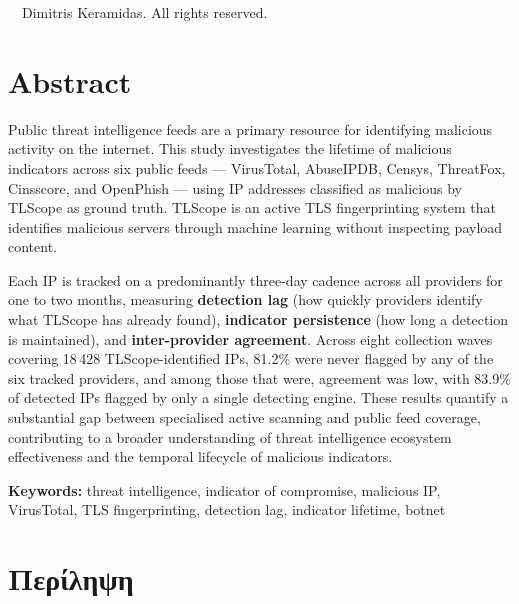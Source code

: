 \documentclass[12pt, a4paper, twoside]{report}
\begin{document}
\cleardoublepage

\thispagestyle{empty}
\vspace*{\fill}
\begin{center}
  \textcopyright\ \the\year\ Dimitris Keramidas. All rights reserved.
\end{center}
\vspace*{\fill}
\cleardoublepage

\chapter*{Abstract}

Public threat intelligence feeds are a primary resource for identifying malicious activity on the
internet. This study investigates the lifetime of malicious indicators across six public feeds
--- VirusTotal, AbuseIPDB, Censys, ThreatFox, Cinsscore, and OpenPhish --- using IP addresses
classified as malicious by TLScope as ground truth. TLScope is an active TLS fingerprinting system
that identifies malicious servers through machine learning without inspecting payload content.

Each IP is tracked on a predominantly three-day cadence across all providers for one to two
months, measuring
\textbf{detection lag} (how quickly providers identify what TLScope has already found),
\textbf{indicator persistence} (how long a detection is maintained), and
\textbf{inter-provider agreement}. Across eight collection waves covering 18\,428 TLScope-identified
IPs, 81.2\% were never flagged by any of the six tracked providers, and among those that were,
agreement was low, with 83.9\% of detected IPs flagged by only a single detecting engine. These
results quantify a substantial gap between specialised active scanning and public feed coverage,
contributing to a broader understanding of threat intelligence ecosystem effectiveness and the
temporal lifecycle of malicious indicators.

\bigskip\noindent
\textbf{Keywords:} threat intelligence, indicator of compromise, malicious IP, VirusTotal,
TLS fingerprinting, detection lag, indicator lifetime, botnet

\cleardoublepage

\chapter*{Περίληψη}
\end{document}
